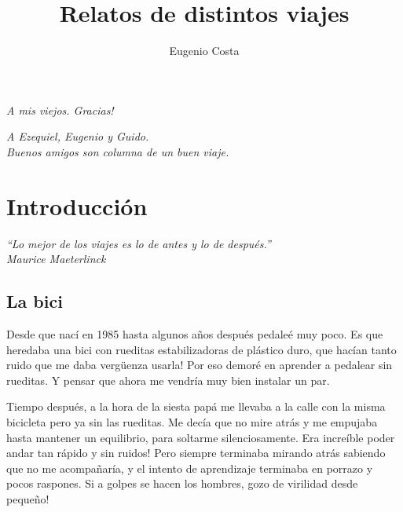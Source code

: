 \documentclass[11pt]{book}
\begin{document}
\frontmatter
\title{Relatos de distintos viajes}
\author{Eugenio Costa}
\date{}
\maketitle
\thispagestyle{empty}

\cleardoublepage

\thispagestyle{empty}
\begin{flushright}
\item \emph{\small A mis viejos. \textexclamdown Gracias!}
\item \emph{\small A Ezequiel, Eugenio y Guido.\\
Buenos amigos son columna de un buen viaje.}
\end{flushright}

\clearpage
\thispagestyle{empty}
\tableofcontents
\thispagestyle{empty}

\clearpage
\thispagestyle{empty}
\setcounter{page}{1}
\chapter{Introducci\'on}

\begin{flushright}
\item \emph{\small ``Lo mejor de los viajes es lo de antes y lo de despu\'es.''\\
Maurice Maeterlinck}
\end{flushright}

\section{La bici}

Desde que nac\'i en 1985 hasta algunos a\~nos despu\'es pedale\'e muy poco.
\textexclamdown Es que heredaba una bici con rueditas estabilizadoras de
pl\'astico duro, que hac\'ian tanto ruido que me daba verg\"uenza usarla! Por
eso demor\'e en aprender a pedalear sin rueditas. Y pensar que ahora me
vendr\'ia muy bien instalar un par.

Tiempo despu\'es, a la hora de la siesta pap\'a me llevaba a la calle con la
misma bicicleta pero ya sin las rueditas. Me dec\'ia que no mire atr\'as y me
empujaba hasta mantener un equilibrio, para soltarme silenciosamente.
\textexclamdown Era incre\'ible poder andar tan r\'apido y sin ruidos! Pero
siempre terminaba mirando atr\'as sabiendo que no me acompa\~nar\'ia, y el
intento de aprendizaje terminaba en porrazo y pocos raspones. \textexclamdown Si
a golpes se hacen los hombres, gozo de virilidad desde peque\~no!
\end{document}
